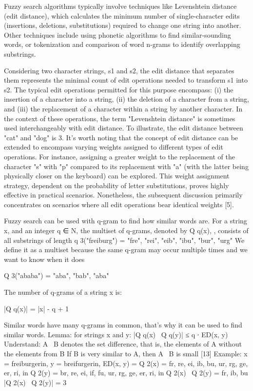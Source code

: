 Fuzzy search algorithms typically involve techniques like Levenshtein distance (edit distance), which calculates the minimum number of single-character edits (insertions, deletions, substitutions) required to change one string into another. Other techniques include using phonetic algorithms to find similar-sounding words, or tokenization and comparison of word n-grams to identify overlapping substrings.

Considering two character strings, s1 and s2, the edit distance that separates them represents the minimal count of edit operations needed to transform s1 into s2. The typical edit operations permitted for this purpose encompass: (i) the insertion of a character into a string, (ii) the deletion of a character from a string, and (iii) the replacement of a character within a string by another character. In the context of these operations, the term "Levenshtein distance" is sometimes used interchangeably with edit distance. To illustrate, the edit distance between "cat" and "dog" is 3. It's worth noting that the concept of edit distance can be extended to encompass varying weights assigned to different types of edit operations. For instance, assigning a greater weight to the replacement of the character "s" with "p" compared to its replacement with "a" (with the latter being physically closer on the keyboard) can be explored. This weight assignment strategy, dependent on the probability of letter substitutions, proves highly effective in practical scenarios. Nonetheless, the subsequent discussion primarily concentrates on scenarios where all edit operations bear identical weights [5].

Fuzzy search can be used with q-gram to find how similar words are.  For a string x, and an integer q ∈ N, the multiset of q-grams, denoted by Q q(x), , consists of all substrings of length q 3("freiburg") = { "fre", "rei", "eib", "ibu", "bur", "urg" }
We define it as a multiset because the same q-gram may occur multiple times and we want to know when it does 

Q 3("ababa") = { "aba", "bab", "aba" }

The number of q-grams of a string x is:

|Q q(x)| = |x| - q + 1

Similar words have many q-grams in common, that's why it can be used to find similar words. 
Lemma: for strings x and y: |Q q(x) \ Q q(y)| ≤ q ∙ ED(x, y)
Understand: A \ B denotes the set difference, that is, the elements of A without the elements from B If B is very similar to A, then A \ B is small [13]
Example:
x = freiburgerin, y = breifurgerin, ED(x, y) = Q 2(x) = { fr, re, ei, ib, bu, ur, rg, ge, er, ri, in } Q 2(y) = { br, re, ei, if, fu, ur, rg, ge, er, ri, in } 
Q 2(x) \ Q 2(y) = {fr, ib, bu}
|Q 2(x) \ Q 2(y)| = 3

